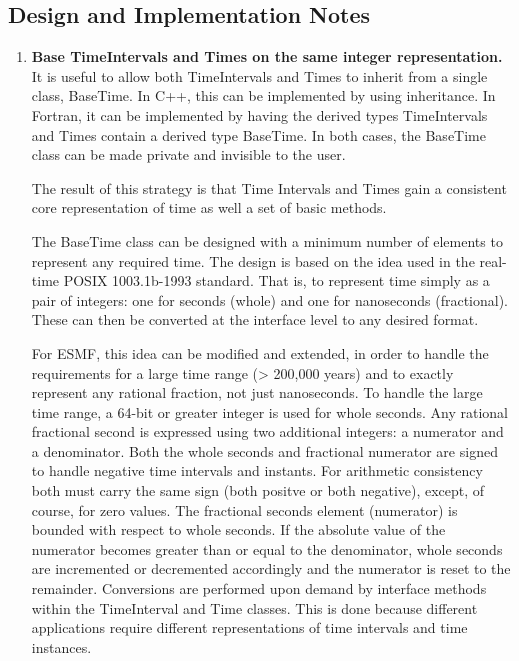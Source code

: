 
\subsection{Design and Implementation Notes}
\begin{enumerate}

\item {\bf Base TimeIntervals and Times on the same integer representation.} 
It is useful to allow both TimeIntervals and Times to 
inherit from a single class, BaseTime.  In C++, this can be
implemented by using inheritance.  In Fortran, it can be implemented
by having the derived types TimeIntervals and Times
contain a derived type BaseTime.  In both cases, the 
BaseTime class can be made private and invisible to the user.

The result of this strategy is that Time Intervals and 
Times gain a consistent core representation of time as well a set
of basic methods.

The BaseTime class can be designed with a minimum number of elements
to represent any required time.  The design is based on the idea used
in the real-time POSIX 1003.1b-1993 standard.  That is, to represent
time simply as a pair of integers: one for seconds (whole) and one for
nanoseconds (fractional).  These can then be converted at the interface
level to any desired format.

For ESMF, this idea can be modified and extended, in order to handle the
requirements for a large time range (> 200,000 years) and to exactly
represent any rational fraction, not just nanoseconds.  To handle the
large time range, a 64-bit or greater integer is used for whole seconds.
Any rational fractional second is expressed using two additional integers:
a numerator and a denominator.  Both the whole seconds and fractional
numerator are signed to handle negative time intervals and instants.
For arithmetic consistency both must carry the same sign (both positve
or both negative), except, of course, for zero values.  The fractional
seconds element (numerator) is bounded with respect to whole seconds. 
If the absolute value of the
numerator becomes greater than or equal to the denominator, whole
seconds are incremented or decremented accordingly and the numerator is
reset to the remainder.  Conversions are performed upon demand by
interface methods within the TimeInterval and
Time classes.  This is done because different applications require different
representations of time intervals and time instances.


\end{enumerate}
